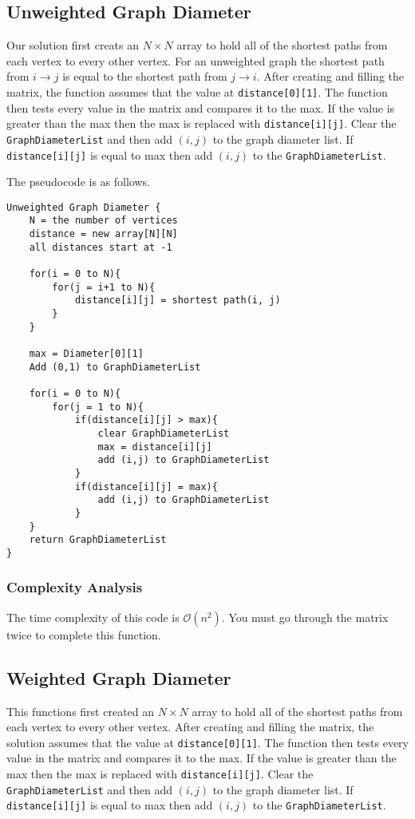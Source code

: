 \documentclass{article}
\begin{document}
\subsection{Unweighted Graph Diameter}
Our solution first creats an $N \times N$ array to hold all of the shortest paths from each vertex to every other
vertex. For an unweighted graph the shortest path from $i \rightarrow j$ is equal to the shortest path from $j \rightarrow i$. After creating and filling the matrix, the function assumes that the value at \texttt{distance[0][1]}. The function then tests every value in the matrix and compares it to the max. If the value is greater than the max then the max is replaced
with \texttt{distance[i][j]}. Clear the \texttt{GraphDiameterList} and then add $(i,j)$ to the graph diameter list. If \texttt{distance[i][j]} is equal to max then add $(i,j)$ to the \texttt{GraphDiameterList}.

The pseudocode is as follows.

\begin{verbatim}
Unweighted Graph Diameter {
    N = the number of vertices
    distance = new array[N][N]
    all distances start at -1

    for(i = 0 to N){
        for(j = i+1 to N){
            distance[i][j] = shortest path(i, j)
        }
    }

    max = Diameter[0][1]
    Add (0,1) to GraphDiameterList

    for(i = 0 to N){
        for(j = 1 to N){
            if(distance[i][j] > max){
                clear GraphDiameterList
                max = distance[i][j]
                add (i,j) to GraphDiameterList
            }
            if(distance[i][j] = max){
                add (i,j) to GraphDiameterList
            }
    }
    return GraphDiameterList
}
\end{verbatim}

\subsubsection{Complexity Analysis}
The time complexity of this code is $\mathcal{O}(n^2)$. You must go through the matrix twice to complete this function.

\subsection{Weighted Graph Diameter}
This functions first created an $N \times N$ array to hold all of the shortest paths from each vertex to every other
vertex. After creating and filling the matrix, the solution assumes that the value at \texttt{distance[0][1]}. The function then tests every value in the matrix and compares it to the max. If the value is greater than the max then the max is replaced
with \texttt{distance[i][j]}. Clear the \texttt{GraphDiameterList} and then add $(i, j)$ to the graph diameter list. If \texttt{distance[i][j]} is equal to max then add $(i, j)$ to the \texttt{GraphDiameterList}.
\end{document}
